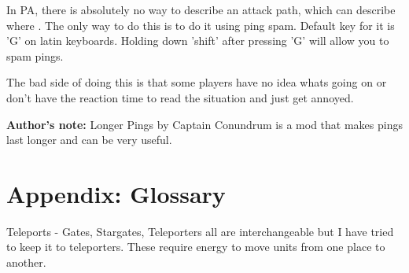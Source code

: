 \documentclass[]{article}
\begin{document}
In PA, there is absolutely no way to describe an attack path, which can describe where .  The only way to do this is to do it using ping spam.  Default key for it is 'G' on latin keyboards.  Holding down 'shift' after pressing 'G' will allow you to spam pings.  

The bad side of doing this is that some players have no idea whats going on or don't have the reaction time to read the situation and just get annoyed. 

\textbf{Author's note:} Longer Pings by Captain Conundrum is a mod that makes pings last longer and can be very useful.  


\section{Appendix: Glossary}

Teleports - Gates, Stargates, Teleporters all are interchangeable but I have tried to keep it to teleporters.  These require energy to move units from one place to another.  
\end{document}
